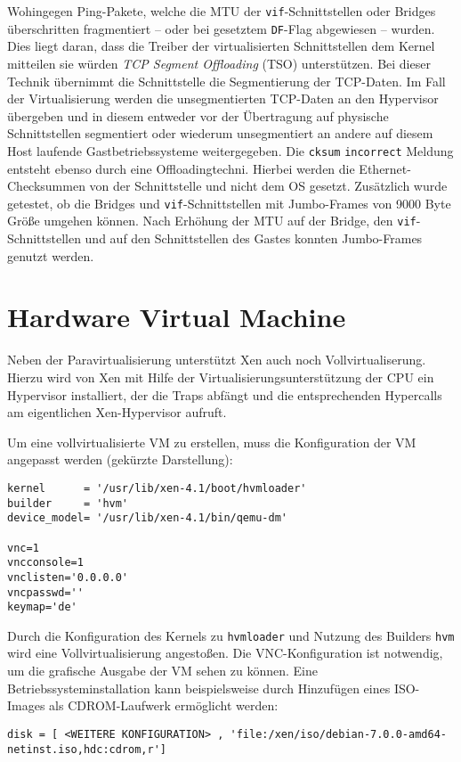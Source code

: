Wohingegen Ping-Pakete, welche die MTU der \verb#vif#-Schnittstellen oder Bridges überschritten fragmentiert -- oder bei gesetztem \verb#DF#-Flag abgewiesen -- wurden.
Dies liegt daran, dass die Treiber der virtualisierten Schnittstellen dem Kernel mitteilen sie würden \emph{TCP Segment Offloading} (TSO) unterstützen. Bei dieser Technik übernimmt die Schnittstelle die Segmentierung der TCP-Daten. Im Fall der Virtualisierung werden die unsegmentierten TCP-Daten an den Hypervisor übergeben und in diesem entweder vor der Übertragung auf physische Schnittstellen segmentiert oder wiederum unsegmentiert an andere auf diesem Host laufende Gastbetriebssysteme weitergegeben. Die \verb#cksum# \verb#incorrect# Meldung entsteht ebenso durch eine Offloadingtechni. Hierbei werden die Ethernet-Checksummen von der Schnittstelle und nicht dem OS gesetzt. 
Zusätzlich wurde getestet, ob die Bridges und \verb#vif#-Schnittstellen mit Jumbo-Frames von 9000 Byte Größe umgehen können. Nach Erhöhung der MTU auf der Bridge, den \verb#vif#-Schnittstellen und auf den Schnittstellen des Gastes konnten Jumbo-Frames genutzt werden.

\section{Hardware Virtual Machine}
\label{hvm_vm}
Neben der Paravirtualisierung unterstützt Xen auch noch Vollvirtualiserung. Hierzu wird von Xen mit Hilfe der Virtualisierungsunterstützung der CPU ein Hypervisor installiert, der die Traps abfängt und die entsprechenden Hypercalls am eigentlichen Xen-Hypervisor aufruft.

Um eine vollvirtualisierte VM zu erstellen, muss die Konfiguration der VM angepasst werden (gekürzte Darstellung):
\setupVerbatimOut
\begin{verbatim}
kernel      = '/usr/lib/xen-4.1/boot/hvmloader'
builder     = 'hvm'
device_model= '/usr/lib/xen-4.1/bin/qemu-dm'

vnc=1
vncconsole=1
vnclisten='0.0.0.0'
vncpasswd=''
keymap='de'
\end{verbatim}

Durch die Konfiguration des Kernels zu \verb#hvmloader# und Nutzung des Builders \verb#hvm# wird eine Vollvirtualisierung angestoßen. Die VNC-Konfiguration ist notwendig, um die grafische Ausgabe der VM sehen zu können. Eine Betriebssysteminstallation kann beispielsweise durch Hinzufügen eines ISO-Images als CDROM-Laufwerk ermöglicht werden: 
\setupVerbatimOut
\begin{verbatim}
disk = [ <WEITERE KONFIGURATION> , 'file:/xen/iso/debian-7.0.0-amd64-netinst.iso,hdc:cdrom,r']
\end{verbatim}

